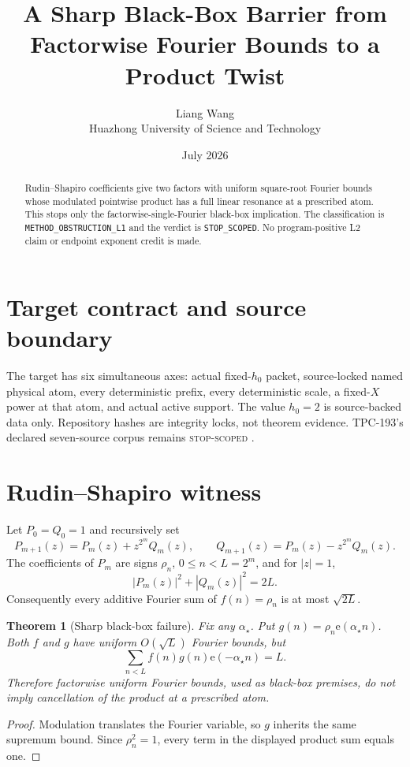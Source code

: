 \documentclass[11pt]{article}
\title{\textbf{A Sharp Black-Box Barrier from Factorwise Fourier Bounds to a Product Twist}}
\author{Liang Wang\\Huazhong University of Science and Technology}
\date{July 2026}
\newtheorem{theorem}{Theorem}
\newcommand{\e}{\mathrm{e}}
\begin{document}
\maketitle
\begin{abstract}
Rudin--Shapiro coefficients give two factors with uniform square-root Fourier bounds whose modulated pointwise product has a full linear resonance at a prescribed atom.  This stops only the factorwise-single-Fourier black-box implication.
The classification is \texttt{METHOD\_\allowbreak{}OBSTRUCTION\_\allowbreak{}L1} and the
verdict is \texttt{STOP\_\allowbreak{}SCOPED}.  No program-positive L2
claim or endpoint exponent credit is made.
\end{abstract}

\section{Target contract and source boundary}
The target has six simultaneous axes: actual fixed-\(h_0\) packet,
source-locked named physical atom, every deterministic prefix, every
deterministic scale, a fixed-\(X\) power at that atom, and actual active
support.  The value \(h_0=2\) is source-backed data only.  Repository hashes
are integrity locks, not theorem evidence.  TPC-193's declared seven-source
corpus remains \textsc{stop-scoped} \citep{WangTPC193}.


\section{Rudin--Shapiro witness}
Let \(P_0=Q_0=1\) and recursively set
\[
 P_{m+1}(z)=P_m(z)+z^{2^m}Q_m(z),\qquad
 Q_{m+1}(z)=P_m(z)-z^{2^m}Q_m(z).
\]
The coefficients of \(P_m\) are signs \(\rho_n\), \(0\le n<L=2^m\),
and for \(|z|=1\),
\[
 |P_m(z)|^2+|Q_m(z)|^2=2L.
\]
Consequently every additive Fourier sum of
\(f(n)=\rho_n\) is at most \(\sqrt{2L}\).

\begin{theorem}[Sharp black-box failure]
Fix any \(\alpha_\star\).  Put
\(g(n)=\rho_n \e(\alpha_\star n)\).  Both \(f\) and \(g\) have uniform
\(O(\sqrt L)\) Fourier bounds, but
\[
 \sum_{n<L}f(n)g(n)\e(-\alpha_\star n)=L.
\]
Therefore factorwise uniform Fourier bounds, used as black-box premises,
do not imply cancellation of the product at a prescribed atom.
\end{theorem}
\begin{proof}
Modulation translates the Fourier variable, so \(g\) inherits the same
supremum bound.  Since \(\rho_n^2=1\), every term in the displayed product
sum equals one.
\end{proof}
\end{document}
